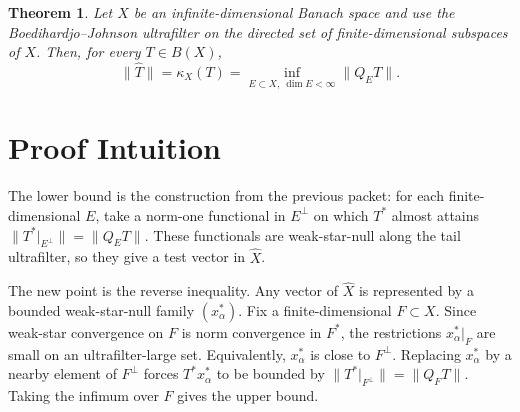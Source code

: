 \documentclass[11pt]{article}
\newtheorem{theorem}{Theorem}
\begin{document}
\begin{theorem}
Let \(X\) be an infinite-dimensional Banach space and use the
Boedihardjo--Johnson ultrafilter on the directed set of finite-dimensional
subspaces of \(X\).  Then, for every \(T\in B(X)\),
\[
  \|\widehat T\|=\kappa_X(T)
  =\inf_{E\subset X,\ \dim E<\infty}\|Q_E T\|.
\]
\end{theorem}

\section*{Proof Intuition}

The lower bound is the construction from the previous packet: for each
finite-dimensional \(E\), take a norm-one functional in \(E^\perp\) on which
\(T^*\) almost attains \(\|T^*|_{E^\perp}\|=\|Q_E T\|\).  These functionals are
weak-star-null along the tail ultrafilter, so they give a test vector in
\(\widehat X\).

The new point is the reverse inequality.  Any vector of \(\widehat X\) is
represented by a bounded weak-star-null family \((x_\alpha^*)\).  Fix a
finite-dimensional \(F\subset X\).  Since weak-star convergence on \(F\) is
norm convergence in \(F^*\), the restrictions \(x_\alpha^*|_F\) are small on
an ultrafilter-large set.  Equivalently, \(x_\alpha^*\) is close to
\(F^\perp\).  Replacing \(x_\alpha^*\) by a nearby element of \(F^\perp\)
forces \(T^*x_\alpha^*\) to be bounded by \(\|T^*|_{F^\perp}\|=\|Q_FT\|\).
Taking the infimum over \(F\) gives the upper bound.
\end{document}
